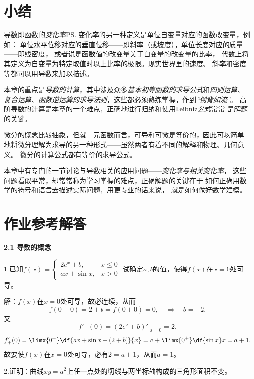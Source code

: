 \section{小结}

导数即函数的{\it 变化率}\ps{变化率的另一种定义是单位自变量对应的函数改变量，例如：
单位水平位移对应的垂直位移——即斜率（或坡度），单位长度对应的质量——即线密度}，
或者说是函数值的改变量关于自变量的改变量的比率，
代数上将其定义为自变量为特定取值时以上比率的极限。现实世界里的速度、
斜率和密度等都可以用导数来加以描述。

本章的重点是{\it 导数的计算}，其中涉及众多{\it 基本初等函数的求导公式}和{\it 四则运算、
复合运算、函数逆运算的求导法则}，这些都必须熟练掌握，作到{\it “倒背如流”}。
高阶导数的计算是本章的一个难点，正确地进行归纳和使用Leibniz{\it 公式}常常
是解题的关键。

微分的概念比较抽象，但就一元函数而言，可导和可微是等价的，因此可以简单
地将微分理解为求导的另一种形式——虽然两者有着不同的解释和物理、几何意义。
微分的计算公式都有等价的求导公式。

本章中有专门的一节讨论与导数相关的应用问题——{\it 变化率与相关变化率}，
这些问题看似平常，却常常称为学习掌握的难点，正确解题的关键在于
如何正确用数学的符号和语言去描述实际问题，用更专业的话来说，
就是如何做好数学建模。

\newpage

\section*{作业参考解答}

\begin{center}
	\bf 2.1 导数的概念
\end{center}

\bigskip

1.已知$f(x)=\left\{\begin{array}{ll}
2e^x+b,& x\leq0\\ ax+\sin x,& x> 0
\end{array}\right.$
试确定$a,b$的值，使得$f(x)$在$x=0$处可导。

解：$f(x)$在$x=0$处可导，故必连续，从而
$$f(0-0)=2+b=f(0+0)=0,\quad\Rightarrow \quad b=-2.$$
又
$$f'_-(0)=(2e^x+b)'|_{x=0}=2.$$
$$f'_+(0)=\limx{0^+}\df{ax+\sin x-(2+b)}{x}
=a+\limx{0^+}\df{\sin x}x=a+1.$$
故要使$f(x)$在$x=0$处可导，必有$2=a+1$，从而$a=1$。
\fin

\bigskip

2.证明：曲线$xy=a^2$上任一点处的切线与两坐标轴构成的三角形面积不变。

